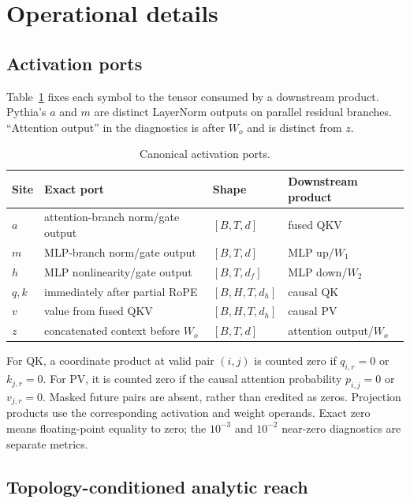 \clearpage
\section{Operational details}
\label{app:operations}

\subsection{Activation ports}

Table~\ref{tab:ports} fixes each symbol to the tensor consumed by a downstream
product.  Pythia's $a$ and $m$ are distinct LayerNorm outputs on parallel
residual branches.  ``Attention output'' in the diagnostics is after $W_o$ and
is distinct from $z$.

\begin{table}[h]
\centering
\caption{Canonical activation ports.}
\label{tab:ports}
\small
\begin{tabular}{llll}
\toprule
Site & Exact port & Shape & Downstream product \\
\midrule
$a$ & attention-branch norm/gate output & $[B,T,d]$ & fused QKV \\
$m$ & MLP-branch norm/gate output & $[B,T,d]$ & MLP up/$W_1$ \\
$h$ & MLP nonlinearity/gate output & $[B,T,d_f]$ & MLP down/$W_2$ \\
$q,k$ & immediately after partial RoPE & $[B,H,T,d_h]$ & causal QK \\
$v$ & value from fused QKV & $[B,H,T,d_h]$ & causal PV \\
$z$ & concatenated context before $W_o$ & $[B,T,d]$ & attention output/$W_o$ \\
\bottomrule
\end{tabular}
\end{table}

For QK, a coordinate product at valid pair $(i,j)$ is counted zero if
$q_{i,r}=0$ or $k_{j,r}=0$.  For PV, it is counted zero if the causal attention
probability $p_{i,j}=0$ or $v_{j,r}=0$.  Masked future pairs are absent, rather
than credited as zeros.  Projection products use the corresponding activation
and weight operands.  Exact zero means floating-point equality to zero; the
$10^{-3}$ and $10^{-2}$ near-zero diagnostics are separate metrics.

\subsection{Topology-conditioned analytic reach}

